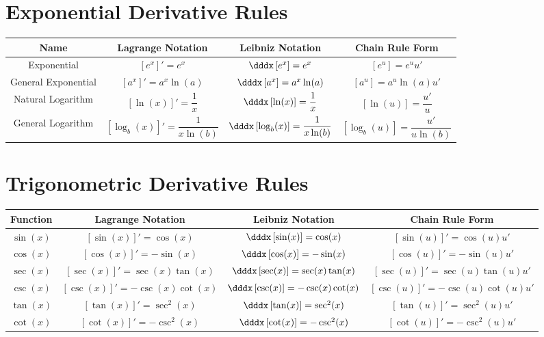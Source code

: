 \documentclass{siproblemset}
\begin{document}
    \section{Exponential Derivative Rules}
    \begin{tabular}{|c c c c|}
        \hline
        Name & Lagrange Notation & Leibniz Notation & Chain Rule Form \\
        \hline
        Exponential & $\left[e^x\right]'=e^x$ & $\dddx\left[e^x\right]=e^x$ & $\left[e^u\right]=e^uu'$ \\
        General Exponential & $\left[a^x\right]'=a^x\ln(a)$ & $\dddx\left[a^x\right]=a^x\ln(a)$ & $\left[a^u\right]=a^u\ln(a)u'$ \\
        \hline
        Natural Logarithm & $\left[\ln(x)\right]'=\dfrac1x$ & $\dddx\left[\ln(x)\right]=\dfrac1x$ & $\left[\ln(u)\right]=\dfrac{u'}{u}$ \\
        General Logarithm & $\left[\log_b(x)\right]'=\dfrac{1}{x\ln(b)}$ & $\dddx\left[\log_b(x)\right]=\dfrac{1}{x\ln(b)}$ & $\left[\log_b(u)\right]=\dfrac{u'}{u\ln(b)}$ \\
        \hline
    \end{tabular}

    \section{Trigonometric Derivative Rules}
    \begin{tabular}{|c c c c|}
        \hline
        Function & Lagrange Notation & Leibniz Notation & Chain Rule Form \\
        \hline
        $\sin (x)$ & $[\sin (x)]'=\cos(x)$ & $\dddx\left[\sin (x)\right]=\cos (x)$ & $[\sin (u)]'=\cos(u)u'$ \\
        $\cos(x)$ & $[\cos (x)]'=-\sin (x)$ & $\dddx\left[\cos (x)\right]=-\sin (x)$ & $[\cos (u)]'=-\sin(u)u'$ \\
        \hline
        $\sec(x)$ & $[\sec(x)]'=\sec(x)\tan(x)$ & $\dddx\left[\sec(x)\right]=\sec(x)\tan(x)$ & $[\sec(u)]'=\sec(u)\tan(u)u'$ \\
        $\csc(x)$ & $[\csc(x)]'=-\csc(x)\cot(x)$ & $\dddx\left[\csc(x)\right]=-\csc(x)\cot(x)$ & $[\csc(u)]'=-\csc(u)\cot(u)u'$ \\
        \hline
        $\tan(x)$ & $[\tan(x)]'=\sec^2(x)$ & $\dddx\left[\tan(x)\right]=\sec^2(x)$ & $[\tan(u)]'=\sec^2(u)u'$ \\
        $\cot(x)$ & $[\cot(x)]'=-\csc^2(x)$ & $\dddx\left[\cot(x)\right]=-\csc^2(x)$ & $[\cot(u)]'=-\csc^2(u)u'$ \\
        \hline
    \end{tabular}
\end{document}
